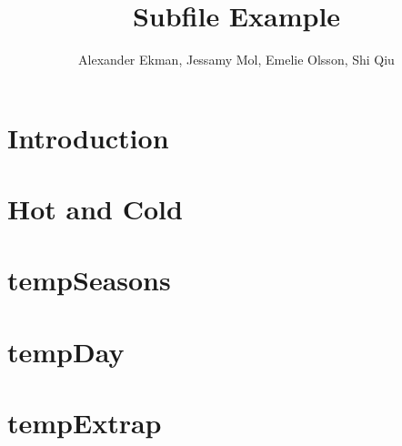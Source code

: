 \documentclass[a4paper,10pt]{article}
\title{Subfile Example}
\author{Alexander Ekman, Jessamy Mol, Emelie Olsson, Shi Qiu}
\date{ }
\begin{document}
 
 
 

\maketitle

\section{Introduction}
 


\section{Hot and Cold}


\section{tempSeasons}


\section{tempDay}


\section{tempExtrap}




 
 
\end{document}
